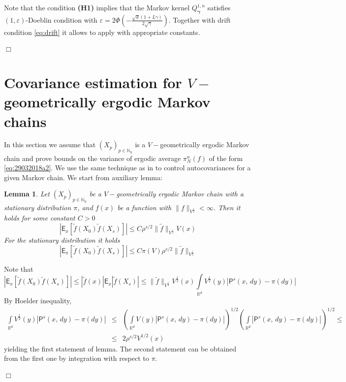 \documentclass[bj]{imsart}
\def\nset{\mathbb{N}}
\def\rset{\mathbb{R}}
\def\rset{\mathbb{R}}
\newcommand{\proofendsign}{$\Box$}
\newtheorem{lem}[thm]{Lemma}
\newenvironment{proof}{{\noindent \bf Proof }}
 {{\hspace*{\fill}\proofendsign\par\bigskip}}
\begin{document}
\begin{proof} Note that the condition {\bf (H1)} implies that the Markov kernel $Q^{1,n}_{\boldsymbol{\gamma}}$ satisfies $(1,\varepsilon)$-Doeblin condition with $\varepsilon = 2\Phi\left(-\frac{\sqrt{d}(1+L\gamma)}{2\sqrt{\gamma}}\right)$. Together with drift condition \ref{eq:drift} it allows to apply \cite[Theorem~19.4.1]{douc:moulines:priouret:soulier:2018} with appropriate constants.
\end{proof}

\section{Covariance estimation for $V-$geometrically ergodic Markov chains}\label{sec:appendix_moments}
In this section we assume that $(X_p)_{p \in \nset_0}$ is a $V-$geometrically ergodic Markov chain and prove bounds on the variance of ergodic average $\pi_N^n(f)$ of the form \eqref{eq:29032018a2}. We use the same technique as in \cite{belomestny2019esvm} to control autocovariances for a given Markov chain. We start from auxiliary lemma:
\begin{lem} 
\label{lem:fp_covariance}
Let $(X_p)_{p \in \nset_0}$ be a $V-$geometrically ergodic Markov chain with a stationary distribution $\pi$, and $f(x)$ be a function with $\|f\|_{V^{\frac{1}{2}}} < \infty$. Then it holds for some constant $C > 0$
\begin{equation}
|\mathsf{E}_x[\tilde{f}(X_0)\tilde{f}(X_s)]| \leq C\rho^{s/2}\|\tilde{f}\|_{V^{\frac{1}{2}}}V(x)
\end{equation}
For the stationary distribution it holds
\begin{equation}
|\mathsf{E}_{\pi}[\tilde{f}(X_0)\tilde{f}(X_s)]| \leq C\pi(V)\rho^{s/2}\|\tilde{f}\|_{V^{\frac{1}{2}}}
\end{equation}
\end{lem}
\begin{proof}
Note that
\[
|\mathsf{E}_x[\tilde{f}(X_0)\tilde{f}(X_s)]| \leq |\tilde{f}(x)| \mathsf{E}_x|\tilde{f}(X_s)| \leq \|\tilde{f}\|_{V^{\frac{1}{2}}}V^{\frac{1}{2}}(x)\int\limits_{\rset^d} V^{\frac{1}{2}}(y)|\mathsf{P}^{s}(x,\,dy)-\pi(dy)|
\]
By Hoelder inequality, 
\begin{eqnarray*}
\int\limits_{\rset^d} V^{\frac{1}{2}}(y)|\mathsf{P}^{s}(x,\,dy)-\pi(dy)| & \leq & \left(\int\limits_{\rset^d} V(y)|\mathsf{P}^{s}(x,\,dy)-\pi(dy)|\right)^{1/2}\left(\int\limits_{\rset^d}|\mathsf{P}^{s}(x,\,dy)-\pi(dy)|\right)^{1/2} \leq \\
& \leq & 2\rho^{s/2}V^{1/2}(x)
\end{eqnarray*}
yielding the first statement of lemma. The second statement can be obtained from the first one by integration with respect to $\pi$. 
\end{proof}
 
\end{document}
